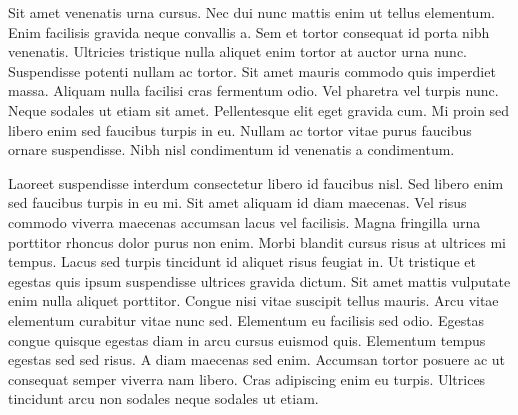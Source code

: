 Sit amet venenatis urna cursus. Nec dui nunc mattis enim ut tellus elementum. Enim facilisis gravida neque convallis a. Sem et tortor consequat id porta nibh venenatis. Ultricies tristique nulla aliquet enim tortor at auctor urna nunc. Suspendisse potenti nullam ac tortor. Sit amet mauris commodo quis imperdiet massa. Aliquam nulla facilisi cras fermentum odio. Vel pharetra vel turpis nunc. Neque sodales ut etiam sit amet. Pellentesque elit eget gravida cum. Mi proin sed libero enim sed faucibus turpis in eu. Nullam ac tortor vitae purus faucibus ornare suspendisse. Nibh nisl condimentum id venenatis a condimentum.

Laoreet suspendisse interdum consectetur libero id faucibus nisl. Sed libero enim sed faucibus turpis in eu mi. Sit amet aliquam id diam maecenas. Vel risus commodo viverra maecenas accumsan lacus vel facilisis. Magna fringilla urna porttitor rhoncus dolor purus non enim. Morbi blandit cursus risus at ultrices mi tempus. Lacus sed turpis tincidunt id aliquet risus feugiat in. Ut tristique et egestas quis ipsum suspendisse ultrices gravida dictum. Sit amet mattis vulputate enim nulla aliquet porttitor. Congue nisi vitae suscipit tellus mauris. Arcu vitae elementum curabitur vitae nunc sed. Elementum eu facilisis sed odio. Egestas congue quisque egestas diam in arcu cursus euismod quis. Elementum tempus egestas sed sed risus. A diam maecenas sed enim. Accumsan tortor posuere ac ut consequat semper viverra nam libero. Cras adipiscing enim eu turpis. Ultrices tincidunt arcu non sodales neque sodales ut etiam.
